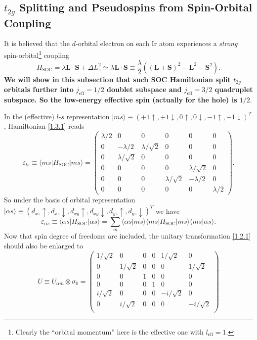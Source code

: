 \documentclass[10pt,nofootinbib]{revtex4}
\begin{document}
	\subsection{$t_{2g}$ Splitting and Pseudospins from Spin-Orbital Coupling}
		It is believed that the $d$-orbital electron on each Ir atom experiences a \emph{strong} spin-orbital\footnote{Clearly the ``orbital momentum'' here is the effective one with $l_{\text{eff}}=1$.} coupling
		\begin{equation}\label{1.3.1}
			H_{\text{SOC}}=\lambda\bm{L\cdot S}+\Delta L_z^2\simeq \lambda\bm{L\cdot S}\equiv\dfrac{\lambda}{2}\left((\bm{L}+\bm{S})^2-\bm{L}^2-\bm{S}^2\right).
		\end{equation}
		\indent \textbf{We will show in this subsection that such SOC Hamiltonian split $t_{2g}$ orbitals further into $j_{\text{eff}}=1/2$ doublet subspace and $j_{\text{eff}}=3/2$ quadruplet subspace. So the low-energy effective spin (actually for the hole) is $1/2$}.\par
		In the (effective) $l$-$s$ representation $|ms\rangle\equiv(+1\uparrow,+1\downarrow,0\uparrow,0\downarrow,-1\uparrow,-1\downarrow)^T$, Hamiltonian \eqref{1.3.1} reads
		\begin{equation}\label{1.3.2}
			\varepsilon_{ls}\equiv\langle ms|H_{\text{SOC}}|ms\rangle=\left(\begin{array}{cccccc}
				\lambda/2 & 0 & 0 & 0 & 0 & 0\\
				0 & -\lambda/2 & \lambda/\sqrt{2} & 0 & 0 & 0\\
				0 & \lambda/\sqrt{2} & 0 & 0 & 0 & 0\\
				0 & 0 & 0 & 0 & \lambda/\sqrt{2} & 0\\
				0 & 0 & 0 & \lambda/\sqrt{2} & -\lambda/2 & 0\\
				0 & 0 & 0 & 0 & 0 & \lambda/2
			\end{array}\right).
		\end{equation}
		So under the basis of orbital representation $|\alpha s\rangle\equiv(d_{xz}\uparrow,d_{xz}\downarrow,d_{xy}\uparrow,d_{xy}\downarrow,d_{yz}\uparrow,d_{yz}\downarrow)^T$ we have
		\begin{equation*}
			\varepsilon_{\alpha s}\equiv\langle \alpha s|H_{\text{SOC}}|\alpha s\rangle=\sum_m\langle \alpha s|ms\rangle\langle ms|H_{\text{SOC}}|ms\rangle\langle ms|\alpha s\rangle.
		\end{equation*}
		Now that spin degree of freedoms are included, the unitary transformation \eqref{1.2.1} should also be enlarged to
		\begin{equation}\label{1.3.3}
			U\equiv U_{\alpha m}\otimes \sigma_0=
			\left(\begin{array}{cccccc}
				1/\sqrt{2} & 0 & 0 & 0 & 1/\sqrt{2} & 0 \\
				0 & 1/\sqrt{2} & 0 & 0 & 0 & 1/\sqrt{2} \\
				0 & 0 & 1 & 0 & 0 & 0 \\
				0 & 0 & 0 & 1 & 0 & 0 \\
				i/\sqrt{2} & 0 & 0 & 0 & -i/\sqrt{2} & 0 \\
				0 & i/\sqrt{2} & 0 & 0 & 0 & -i/\sqrt{2} \\
			\end{array}\right)
		\end{equation}
\end{document}
